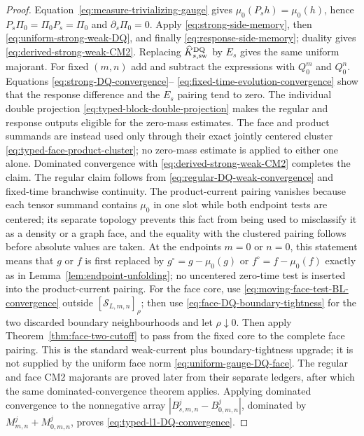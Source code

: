 \documentclass[11pt]{article}
\begin{document}
\begin{proof}
Equation~\eqref{eq:measure-trivializing-gauge} gives
$\mu_0(P_sh)=\mu_0(h)$, hence $P_s\Pi_0=\Pi_0P_s=\Pi_0$ and
$\partial_s\Pi_0=0$.  Apply \eqref{eq:strong-side-memory}, then
\eqref{eq:uniform-strong-weak-DQ}, and finally
\eqref{eq:response-side-memory}; duality gives
\eqref{eq:derived-strong-weak-CM2}.  Replacing
$\widehat K_{s,\rm sw}^{\rm DQ}$ by $E_s$ gives the same uniform majorant.
For fixed $(m,n)$ add and subtract the expressions with $Q_0^m$ and $Q_0^n$.
Equations \eqref{eq:strong-DQ-convergence}--
\eqref{eq:fixed-time-evolution-convergence} show that the response difference
and the $E_s$ pairing tend to zero.  The individual double projection
\eqref{eq:typed-block-double-projection} makes the regular and response
outputs eligible for the zero-mass estimates.  The face and product
summands are instead used only through their exact jointly centered cluster
\eqref{eq:typed-face-product-cluster}; no zero-mass estimate is applied to
either one alone.  Dominated
convergence with \eqref{eq:derived-strong-weak-CM2} completes the claim.  The
regular claim follows from
\eqref{eq:regular-DQ-weak-convergence} and fixed-time branchwise continuity.
The product-current pairing vanishes because each tensor summand contains
$\mu_0$ in one slot while both endpoint tests are centered; its separate
topology prevents this fact from being used to misclassify it as a density
or a graph face, and the equality with the clustered pairing follows before
absolute values are taken.  At the endpoints $m=0$ or $n=0$, this statement
means that $g$ or $f$ is first replaced by $g^\circ=g-\mu_0(g)$ or
$f^\circ=f-\mu_0(f)$ exactly as in
Lemma~\ref{lem:endpoint-unfolding}; no uncentered zero-time test is inserted
into the product-current pairing.  For the face core, use
\eqref{eq:moving-face-test-BL-convergence} outside
$[\mathcal S_{L,m,n}]_\rho$; then use
\eqref{eq:face-DQ-boundary-tightness} for the two discarded boundary
neighbourhoods and let $\rho\downarrow0$.  Then apply
Theorem~\ref{thm:face-two-cutoff} to pass from the fixed core to the complete
face pairing.  This is the standard
weak-current plus boundary-tightness upgrade; it is not supplied by the
uniform face norm \eqref{eq:uniform-gauge-DQ-face}.  The regular and face
CM2 majorants are proved later from their separate ledgers, after which the
same dominated-convergence theorem applies.  Applying dominated convergence
to the nonnegative array
$|B_{s,m,n}^{j}-B_{0,m,n}^{j}|$, dominated by
$M_{m,n}^{j}+M_{0,m,n}^{j}$, proves
\eqref{eq:typed-l1-DQ-convergence}.
\end{proof}
\end{document}
